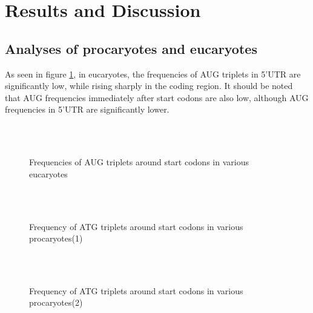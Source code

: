 \section{Results and Discussion}

\subsection{Analyses of procaryotes and eucaryotes}

As seen in figure \ref{freq_euc}, in eucaryotes, the frequencies of
AUG triplets in 5'UTR are significantly low, while rising sharply in
the coding region.  It should be noted that AUG frequencies
immediately after start codons are also low, although AUG frequencies
in 5'UTR are significantly lower.

\begin{figure}
\begin{center}
\\
\\
\end{center}
\caption{Frequencies of AUG triplets around start codons in various
eucaryotes}
\label{freq_euc}
\end{figure}

\begin{figure}
\begin{center}
\\
\\
\end{center}
\caption{Frequency of ATG triplets around start codons in various
procaryotes(1)} 
\label{freq_proc}
\end{figure}

\begin{figure}
\begin{center}
\\
\\
\end{center}
\caption{Frequency of ATG triplets around start codons in various
procaryotes(2)} 
\label{freq_proc2}
\end{figure}

